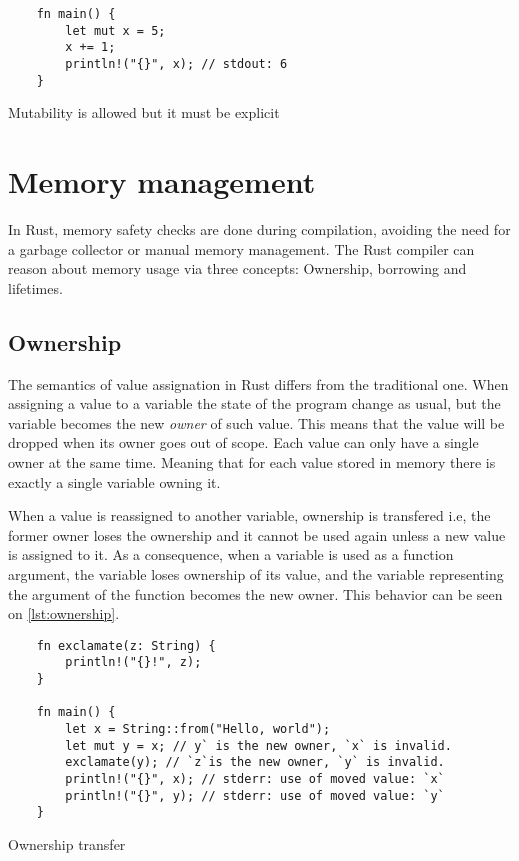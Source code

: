 \begin{listing}
	\begin{verbatim}
    fn main() {
        let mut x = 5;
        x += 1;
        println!("{}", x); // stdout: 6 
    }
	\end{verbatim}
  \caption{Mutability is allowed but it must be explicit}
  \label{lst:mutable}
\end{listing}

\section{Memory management}
In Rust, memory safety checks are done during compilation, avoiding the need for a garbage collector or manual memory management. The Rust compiler can reason about memory usage via three concepts: Ownership, borrowing and lifetimes.

\subsection{Ownership}
The semantics of value assignation in Rust differs from the traditional one. When assigning a value to a variable the state of the program change as usual, but the variable becomes the new \textit{owner} of such value. This means that the value will be dropped when its owner goes out of scope. Each value can only have a single owner at the same time. Meaning that for each value stored in memory there is exactly a single variable owning it. 

When a value is reassigned to another variable, ownership is transfered i.e, the former owner loses the ownership and it cannot be used again unless a new value is assigned to it. As a consequence, when a variable is used as a function argument, the variable loses ownership of its value, and the variable representing the argument of the function becomes the new owner. This behavior can be seen on \ref{lst:ownership}.

\begin{listing}
	\begin{verbatim}
    fn exclamate(z: String) {
        println!("{}!", z);
    }

    fn main() {
        let x = String::from("Hello, world");
        let mut y = x; // y` is the new owner, `x` is invalid.
        exclamate(y); // `z`is the new owner, `y` is invalid.
        println!("{}", x); // stderr: use of moved value: `x`
        println!("{}", y); // stderr: use of moved value: `y`
    }
	\end{verbatim}
  \caption{Ownership transfer}
  \label{lst:ownership}
\end{listing}

